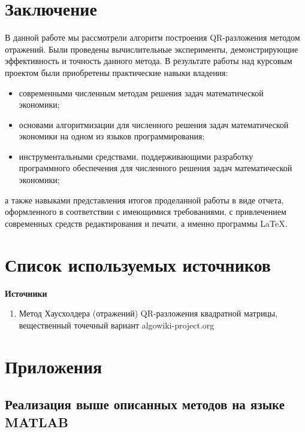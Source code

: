 \documentclass[14pt, titlepage, a4paper]{extarticle} %
\begin{document}
	\section*{Заключение}
	
	В данной работе мы рассмотрели алгоритм построения QR-разложения методом отражений. Были проведены вычислительные эксперименты, демонстрирующие эффективность и точность данного метода.
	В результате работы над курсовым проектом были приобретены практические навыки владения:
	\begin{itemize}
		\item современными численным методам решения задач математической экономики;
		\item основами алгоритмизации для численного решения задач математической экономики на одном из языков программирования;
		\item инструментальными средствами, поддерживающими разработку программного обеспечения для численного решения задач математической экономики; 
	\end{itemize}
	а также навыками представления итогов проделанной работы в виде отчета, оформленного в соответствии с имеющимися требованиями, с привлечением современных средств редактирования и печати, а именно программы LaTeX.
	
	\pagebreak

	
	\section*{Список используемых источников}
	
	\textbf{Источники}
	\begin{enumerate}
		\item Метод Хаусхолдера (отражений) QR-разложения квадратной матрицы, вещественный точечный вариант algowiki-project.org	
	\end{enumerate}

	\pagebreak
	
	
	\section*{Приложения}
	
	
	\subsection*{Реализация выше описанных методов на языке MATLAB}
	
	\begin{Verbatim}[numbers=left,xleftmargin=0mm]

	\end{Verbatim}
	
	\pagebreak	
	
	
\end{document}

